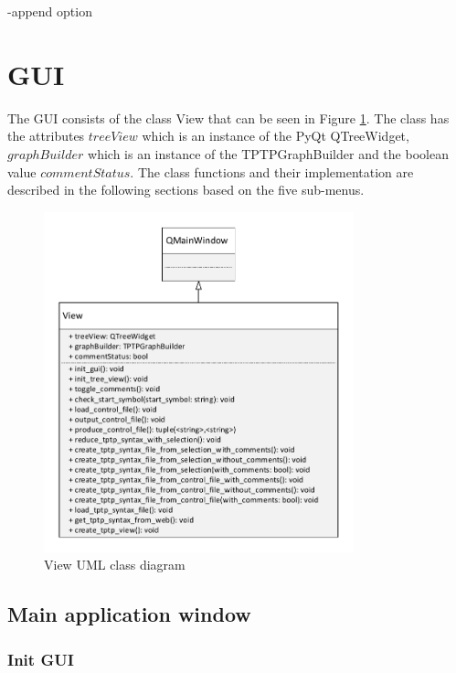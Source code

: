 -append option

\section{GUI}\label{sec:ImplementationGUI}

The GUI consists of the class View that can be seen in Figure \ref{fig:ImplementationViewClassDiagram}. The class has the attributes $treeView$ which is an instance of the PyQt QTreeWidget, $graphBuilder$ which is an instance of the TPTPGraphBuilder and the boolean value $commentStatus$. The class functions and their implementation are described in the following sections based on the five sub-menus.

\begin{figure}[H]
\centering
\includegraphics[width=0.8\textwidth]{images/Implementation_view_class_diagramm.pdf}
\caption{View UML class diagram}
\label{fig:ImplementationViewClassDiagram}
\end{figure}

\subsection{Main application window}\label{sec:ImplementationGUIMainAppli}

\subsubsection{Init GUI}\label{sec:ImplementationGUIInit}

